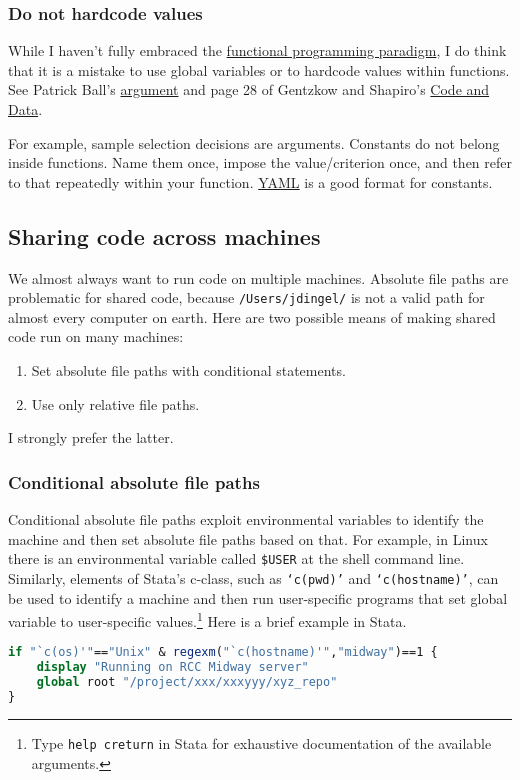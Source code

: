 \subsubsection{Do not hardcode values}

While I haven't fully embraced the \href{https://en.wikipedia.org/wiki/Functional_programming}{functional programming paradigm},
I do think that it is a mistake to use global variables or to hardcode values within functions.
See 
Patrick Ball's \href{https://www.youtube.com/watch?v=ZSunU9GQdcI&t=36m43s}{argument} 
and
page 28 of Gentzkow and Shapiro's \href{https://web.stanford.edu/~gentzkow/research/CodeAndData.pdf}{Code and Data}.

For example, sample selection decisions are arguments.
Constants do not belong inside functions.
Name them once, impose the value/criterion once, and then refer to that repeatedly within your function.
\href{http://yaml.org/}{YAML} is a good format for constants.

\subsection{Sharing code across machines}

We almost always want to run code on multiple machines.
Absolute file paths are problematic for shared code, because \texttt{/Users/jdingel/} is not a valid path for almost every computer on earth.
Here are two possible means of making shared code run on many machines: 
\begin{enumerate}
	\item Set absolute file paths with conditional statements.
	\item Use only relative file paths.
\end{enumerate}

I strongly prefer the latter.

\subsubsection{Conditional absolute file paths}

Conditional absolute file paths exploit environmental variables to identify the machine and then set absolute file paths based on that.
For example, in Linux there is an environmental variable called \texttt{\$USER} at the shell command line.
Similarly, elements of Stata's c-class, such as \texttt{`c(pwd)'} and \texttt{`c(hostname)'}, can be used to identify a machine 
and then run user-specific programs that set global variable to user-specific values.\footnote{
	Type \texttt{help creturn} in Stata for exhaustive documentation of the available arguments.
}
Here is a brief example in Stata.
\begin{lstlisting}[language=stata]
if "`c(os)'"=="Unix" & regexm("`c(hostname)'","midway")==1 {
	display "Running on RCC Midway server"
	global root "/project/xxx/xxxyyy/xyz_repo"
}
\end{lstlisting}

